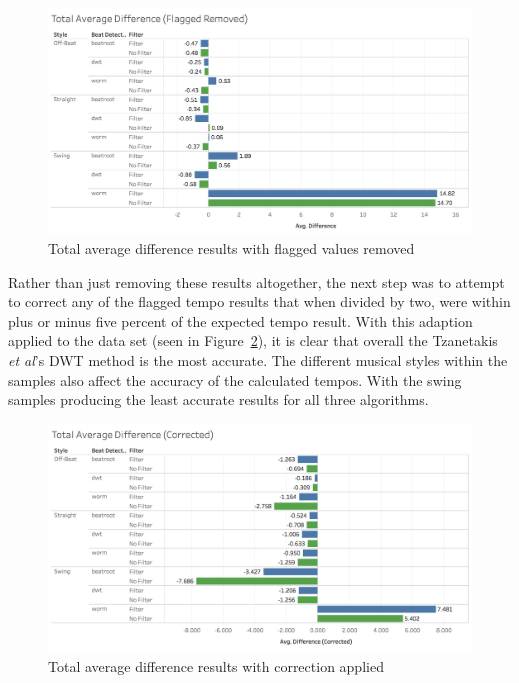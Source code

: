 \documentclass[a4paper, 11pt]{article}
\begin{document}
\begin{figure}[ht]
\centering
\includegraphics[scale=0.25]{images/totAveDiffFR.jpg}
\caption{Total average difference results with flagged values removed}
\label{fig: upAveDiff}
\end{figure}
\clearpage
Rather than just removing these results altogether, the next step was to attempt to correct any of the flagged tempo results that when divided by two, were within plus or minus five percent of the expected tempo result. With this adaption applied to the data set (seen in Figure~\ref{fig: corAveDiff}), it is clear that overall the Tzanetakis \textit{et al}'s \cite{tzane1} DWT method is the most accurate. The different musical styles within the samples also affect the accuracy of the calculated tempos. With the swing samples producing the least accurate results for all three algorithms.


\begin{figure}[htbp]
\centering
\includegraphics[scale=0.25]{images/totAveDiffCor.jpg}
\caption{Total average difference results with correction applied}
\label{fig: corAveDiff}
\end{figure}
\end{document}
